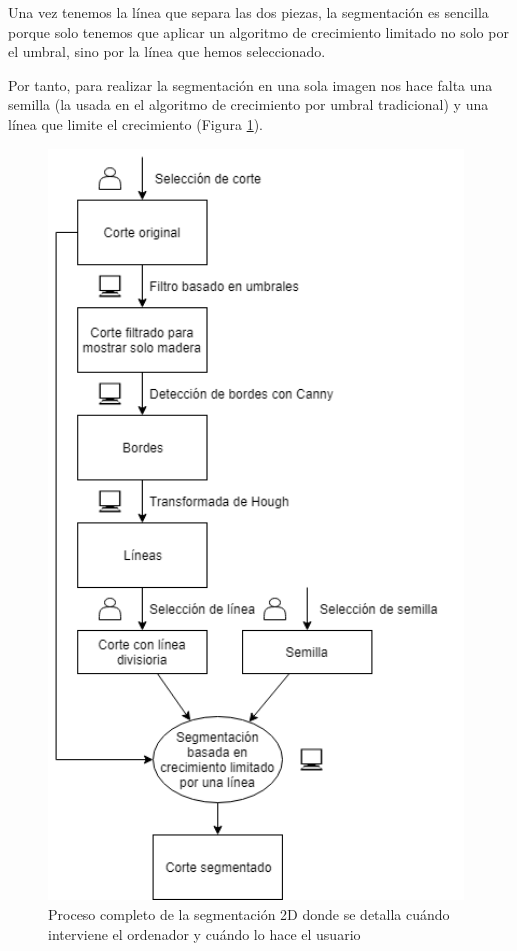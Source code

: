 Una vez tenemos la línea que separa las dos piezas, la segmentación es sencilla porque solo tenemos que aplicar un algoritmo de crecimiento limitado no solo por el umbral, sino por la línea que hemos seleccionado.

Por tanto, para realizar la segmentación en una sola imagen nos hace falta una semilla (la usada en el algoritmo de crecimiento por umbral tradicional) y una línea que limite el crecimiento (Figura \ref{fig:desarrollo/pipeline-segmentacion-2d}).

\begin{figure}[H]
	\centering
	\includegraphics[width=11cm]{imagenes/desarrollo/pipeline-segmentacion-2d}
	\caption{Proceso completo de la segmentación 2D donde se detalla cuándo interviene el ordenador y cuándo lo hace el usuario}
	\label{fig:desarrollo/pipeline-segmentacion-2d}
\end{figure}

